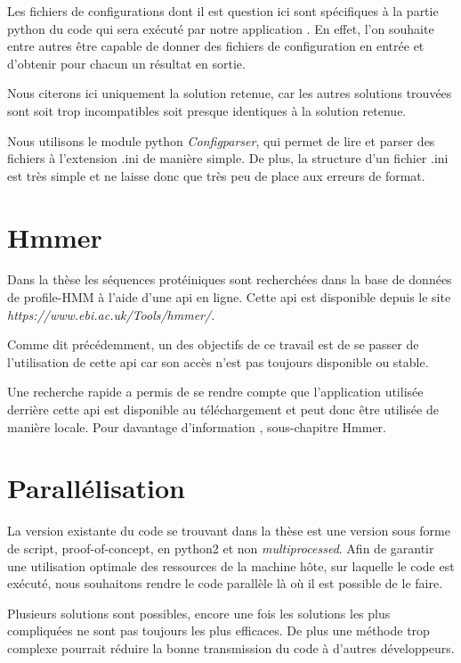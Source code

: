 Les fichiers de configurations dont il est question ici sont spécifiques à la partie python du code qui sera exécuté par notre application . En effet, l'on souhaite entre autres être capable de donner des fichiers de configuration en entrée et d'obtenir pour chacun un résultat en sortie.

Nous citerons ici uniquement la solution retenue, car les autres solutions trouvées sont soit trop incompatibles soit presque identiques à la solution retenue.

Nous utilisons le module python \emph{Configparser}, qui permet de lire et parser des fichiers à l'extension .ini de manière simple. De plus, la structure d'un fichier .ini est très simple et ne laisse donc que très peu de place aux erreurs de format.
 
 
\section{Hmmer}
Dans la thèse \thLeite les séquences protéiniques sont recherchées dans la base de données de profile-HMM à l'aide d'une \gls{api} en ligne. Cette \gls{api} est disponible depuis le site \emph{https://www.ebi.ac.uk/Tools/hmmer/}. 

Comme dit précédemment, un des objectifs de ce travail est de se passer de l'utilisation de cette \gls{api} car son accès n'est pas toujours disponible ou stable.

Une recherche rapide a permis de se rendre compte que l'application utilisée derrière cette \gls{api} est disponible au téléchargement et peut donc être utilisée de manière locale. Pour davantage d'information , sous-chapitre Hmmer.


\section{Parallélisation}

La version existante du code se trouvant dans la thèse \thLeite est une version sous forme de script, proof-of-concept, en python2 et non \emph{multiprocessed}. Afin de garantir une utilisation optimale des ressources de la machine hôte, sur laquelle le code est exécuté, nous souhaitons rendre le code parallèle là où il est possible de le faire.

Plusieurs solutions sont possibles, encore une fois les solutions les plus compliquées ne sont pas toujours les plus efficaces. De plus une méthode trop complexe pourrait réduire la bonne transmission du code à d'autres développeurs.

